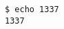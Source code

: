 \documentclass{article}
\begin{document}
\begin{verbatim}
$ echo 1337
1337
\end{verbatim}
\end{document}
